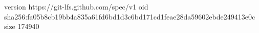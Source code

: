 version https://git-lfs.github.com/spec/v1
oid sha256:fa05b8cb19bb4a835a61fd6bd1d3c6bd171cd1feae28da59602ebde249413e0c
size 174940
